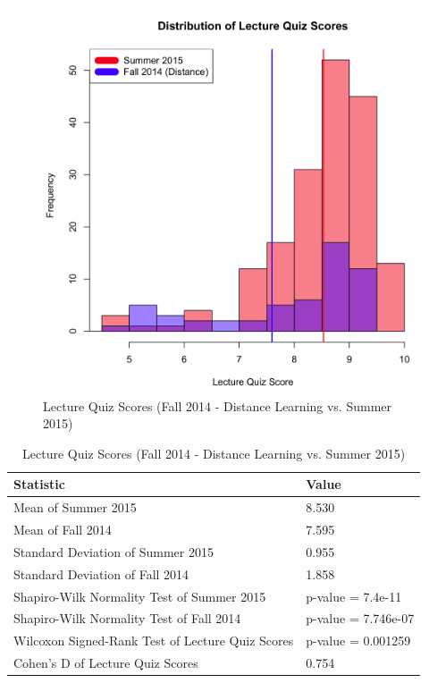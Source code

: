 \begin{figure}
	\centering
	\includegraphics[width=5in]{img/chapter4/lq_su15_vs_f14d}
	\caption[Lecture Quiz Scores (Fall 2014 - Distance Learning vs. Summer 2015)]{Lecture Quiz Scores (Fall 2014 - Distance Learning vs. Summer 2015)}
  \label{fig:lqf14dSu15}
\end{figure}

\begin{small}
\begin{table}
  \centering
  \begin{tabular}{|l|l|}
    \hline
    \textbf{Statistic} & \textbf{Value} \\
	\hline
	Mean of Summer 2015 & 8.530 \\
	\hline
	Mean of Fall 2014 & 7.595 \\
	\hline
	Standard Deviation of Summer 2015 & 0.955 \\
	\hline
	Standard Deviation of Fall 2014 & 1.858 \\
	\hline
	Shapiro-Wilk Normality Test of Summer 2015 & p-value = 7.4e-11 \\
	\hline
	Shapiro-Wilk Normality Test of Fall 2014 & p-value = 7.746e-07 \\
	\hline
	Wilcoxon Signed-Rank Test of Lecture Quiz Scores & p-value = 0.001259 \\
	\hline
	Cohen's D of Lecture Quiz Scores & 0.754 \\
	\hline
  \end{tabular}
	\caption[Lecture Quiz Scores (Fall 2014 - Distance Learning vs. Summer 2015)]{Lecture Quiz Scores (Fall 2014 - Distance Learning vs. Summer 2015)}
  \label{tab:lqf14dSu15}
\end{table}
\end{small}

